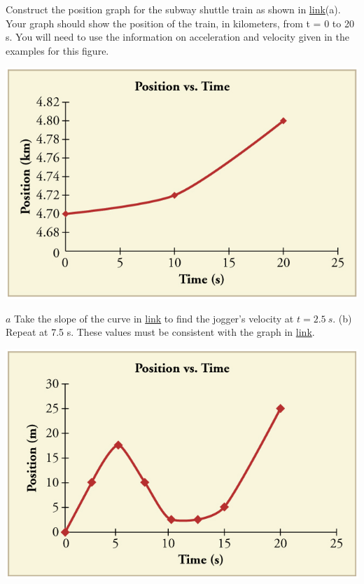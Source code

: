 \documentclass[
]{book}
\begin{document}
\hypertarget{fs-id1372323}{}
\leavevmode{}%
Construct the position graph for the subway shuttle train as shown in
\href{/m54772\#import-auto-id2590556}{link}(a). Your
graph should show the position of the train, in kilometers, from t = 0
to 20 s. You will need to use the information on acceleration and
velocity given in the examples for this figure.

\leavevmode{}%
\includegraphics{images/Figure_02_08Sol_15.jpg}

\hypertarget{fs-id2290187}{}
\leavevmode{}%
\(a\) Take the slope of the curve in
\protect\hyperlink{import-auto-id4064858}{link} to find the
jogger's velocity at \({{t = 2}\text{.}5\ s}{}\). (b) Repeat at 7.5 s.
These values must be consistent with the graph in
\protect\hyperlink{import-auto-id4128350}{link}.

\includegraphics{images/Figure_02_08Sol_16.jpg}
\end{document}
